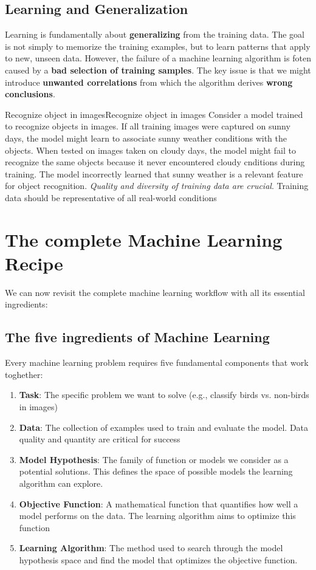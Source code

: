 \documentclass[a4paper]{article}
\theoremstyle{definition}
\begin{document}
\subsection{Learning and Generalization}
Learning is fundamentally about \textbf{generalizing} from the training data. The goal is not simply to memorize the training examples,
but to learn patterns that apply to new, unseen data.
\vspace{1em}
\noindent 
\newline
However, the failure of a machine learning algorithm is foten caused by a \textbf{bad selection of training samples}.
The key issue is that we might introduce \textbf{unwanted correlations} from which the algorithm derives \textbf{wrong conclusions}.
\begin{example}{Recognize object in images}{Recognize object in images}
Consider a model trained to recognize objects in images. If all training images were captured on sunny days, the model might 
learn to associate sunny weather conditions with the objects. When tested on images taken on cloudy days, the model might
fail to recognize the same objects because it never encountered cloudy cnditions during training. The model incorrectly 
learned that sunny weather is a relevant feature for object recognition.
\vspace{1em}
\noindent
\newline
\textit{Quality and diversity of training data are crucial}. Training data should be representative of all real-world 
conditions
\end{example}
\section{The complete Machine Learning Recipe}
We can now revisit the complete machine learning workflow with all its essential ingredients:
\subsection{The five ingredients of Machine Learning}
Every machine learning problem requires five fundamental components that work toghether:
\begin{enumerate}
    \item \textbf{Task}: The specific problem we want to solve (e.g., classify birds vs. non-birds in images)
    \item \textbf{Data}: The collection of examples used to train and evaluate the model. Data quality and quantity are critical for success
    \item \textbf{Model Hypothesis}: The family of function or models we consider as a potential solutions. 
        This defines the space of possible models the learning algorithm can explore.
    \item \textbf{Objective Function}: A mathematical function that quantifies how well a model performs on the data. The learning algorithm aims to optimize this function 
    \item \textbf{Learning Algorithm}: The method used to search through the model hypothesis space and find the model that optimizes the objective function.
\end{enumerate}
\end{document}
